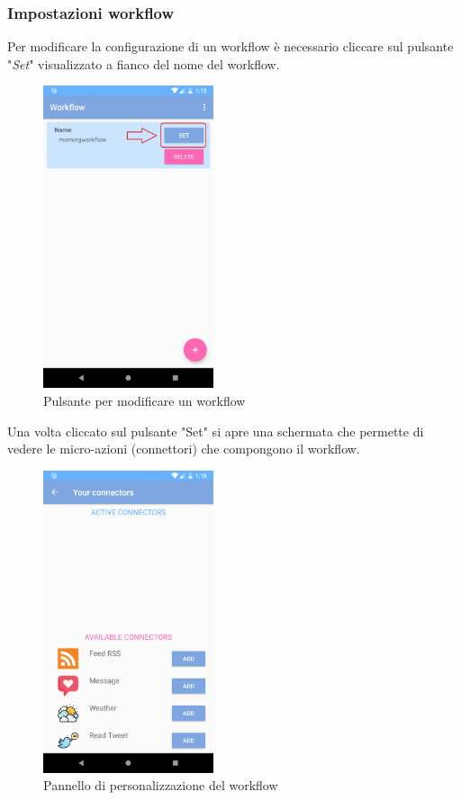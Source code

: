 \subsubsection{Impostazioni workflow}
\label{sec:sec_impostazioni_workflow}
Per modificare la configurazione di un workflow è necessario cliccare sul pulsante "\textit{Set}" visualizzato a fianco del nome del workflow.
\begin{figure}[H]
	\centering
	\includegraphics[width=5cm]{../includes/pics/set_button_workflow.png}
	\caption{\label{fig:set_button_workflow}Pulsante per modificare un workflow}
\end{figure}
Una volta cliccato sul pulsante "Set" si apre una schermata che permette di vedere le micro-azioni (connettori) che compongono il workflow.
\begin{figure}[H]
	\centering
	\includegraphics[width=5cm]{../includes/pics/edit_workflow.png}
	\caption{\label{fig:edit_workflow}Pannello di personalizzazione del workflow}
\end{figure}
